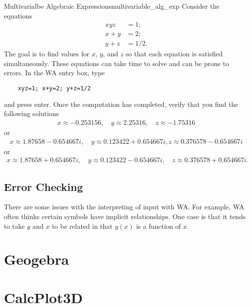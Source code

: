 \begin{ex}{Multivarialbe Algebraic Expressions}{multivariable_alg_exp}
Consider the equations
\begin{align*}
    xyz&=1;\\
    x+y&=2;\\
    y+z&=1/2.
\end{align*}
The goal is to find values for $x$, $y$, and $z$ so that each equation is satisfied simultaneously.  These equations can take time to solve and can be prone to errors.  In the WA entry box, type

\begin{center}
    \begin{BVerbatim}
    xyz=1; x+y=2; y+z=1/2
    \end{BVerbatim}
\end{center}

and press enter.  Once the computation has completed, verify that you find the following solutions
\begin{align*}
    x\approx-0.253156,\quad y\approx2.25316,\quad z\approx-1.75316
\end{align*}
or
\begin{align*}
    x\approx1.87658 - 0.654667 i,\quad y\approx0.123422 + 0.654667 i, z\approx0.376578 - 0.654667 i
\end{align*}
or
\begin{align*}
    x\approx1.87658 + 0.654667 i,\quad y\approx0.123422 - 0.654667 i,\quad z\approx0.376578 + 0.654667 i.
\end{align*}
\end{ex}

\subsection{Error Checking}
There are some issues with the interpreting of input with WA.  For example, WA often thinks certain symbols have implicit relationships.  One case is that it tends to take $y$ and $x$ to be related in that $y(x)$ is a function of $x$.

\section{Geogebra}

\section{CalcPlot3D}
